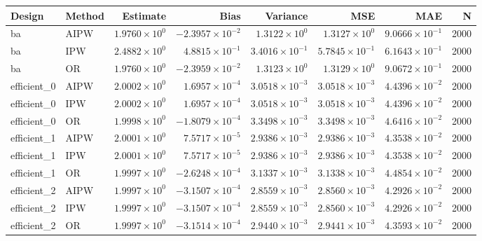 \begin{table}[ht]
\centering
\begin{tabular}{llrrrrrr}
  \toprule
Design & Method & Estimate & Bias & Variance & MSE & MAE & N \\ 
  \midrule
ba & AIPW & $1.9760 \times 10^{0}$ & $-2.3957 \times 10^{-2}$ & $1.3122 \times 10^{0}$ & $1.3127 \times 10^{0}$ & $9.0666 \times 10^{-1}$ & 2000 \\ 
  ba & IPW & $2.4882 \times 10^{0}$ & $4.8815 \times 10^{-1}$ & $3.4016 \times 10^{-1}$ & $5.7845 \times 10^{-1}$ & $6.1643 \times 10^{-1}$ & 2000 \\ 
  ba & OR & $1.9760 \times 10^{0}$ & $-2.3959 \times 10^{-2}$ & $1.3123 \times 10^{0}$ & $1.3129 \times 10^{0}$ & $9.0672 \times 10^{-1}$ & 2000 \\ 
   \midrule
efficient\_0 & AIPW & $2.0002 \times 10^{0}$ & $1.6957 \times 10^{-4}$ & $3.0518 \times 10^{-3}$ & $3.0518 \times 10^{-3}$ & $4.4396 \times 10^{-2}$ & 2000 \\ 
  efficient\_0 & IPW & $2.0002 \times 10^{0}$ & $1.6957 \times 10^{-4}$ & $3.0518 \times 10^{-3}$ & $3.0518 \times 10^{-3}$ & $4.4396 \times 10^{-2}$ & 2000 \\ 
  efficient\_0 & OR & $1.9998 \times 10^{0}$ & $-1.8079 \times 10^{-4}$ & $3.3498 \times 10^{-3}$ & $3.3498 \times 10^{-3}$ & $4.6416 \times 10^{-2}$ & 2000 \\ 
   \midrule
efficient\_1 & AIPW & $2.0001 \times 10^{0}$ & $7.5717 \times 10^{-5}$ & $2.9386 \times 10^{-3}$ & $2.9386 \times 10^{-3}$ & $4.3538 \times 10^{-2}$ & 2000 \\ 
  efficient\_1 & IPW & $2.0001 \times 10^{0}$ & $7.5717 \times 10^{-5}$ & $2.9386 \times 10^{-3}$ & $2.9386 \times 10^{-3}$ & $4.3538 \times 10^{-2}$ & 2000 \\ 
  efficient\_1 & OR & $1.9997 \times 10^{0}$ & $-2.6248 \times 10^{-4}$ & $3.1337 \times 10^{-3}$ & $3.1338 \times 10^{-3}$ & $4.4854 \times 10^{-2}$ & 2000 \\ 
   \midrule
efficient\_2 & AIPW & $1.9997 \times 10^{0}$ & $-3.1507 \times 10^{-4}$ & $2.8559 \times 10^{-3}$ & $2.8560 \times 10^{-3}$ & $4.2926 \times 10^{-2}$ & 2000 \\ 
  efficient\_2 & IPW & $1.9997 \times 10^{0}$ & $-3.1507 \times 10^{-4}$ & $2.8559 \times 10^{-3}$ & $2.8560 \times 10^{-3}$ & $4.2926 \times 10^{-2}$ & 2000 \\ 
  efficient\_2 & OR & $1.9997 \times 10^{0}$ & $-3.1514 \times 10^{-4}$ & $2.9440 \times 10^{-3}$ & $2.9441 \times 10^{-3}$ & $4.3593 \times 10^{-2}$ & 2000 \\ 

\end{tabular}
\end{table}
